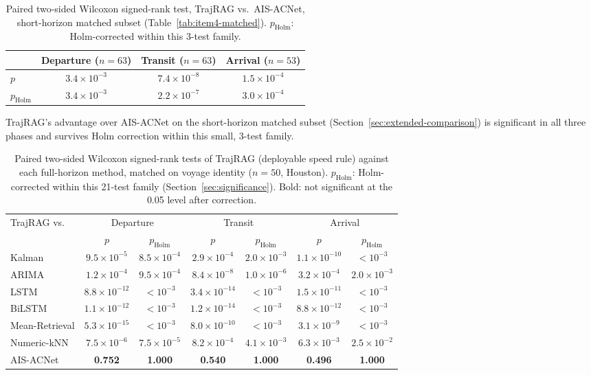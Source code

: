 \begin{table}[t]
\centering
\caption{Paired two-sided Wilcoxon signed-rank test, TrajRAG vs.\
AIS-ACNet, short-horizon matched subset (Table~\ref{tab:item4-matched}).
$p_{\text{Holm}}$: Holm-corrected within this 3-test family.}
\label{tab:item4-wilcoxon}
\footnotesize
\begin{tabular}{lccc}
\toprule
 & Departure ($n=63$) & Transit ($n=63$) & Arrival ($n=53$) \\
\midrule
$p$ & $3.4 \times 10^{-3}$ & $7.4 \times 10^{-8}$ & $1.5 \times 10^{-4}$ \\
$p_{\text{Holm}}$ & $3.4 \times 10^{-3}$ & $2.2 \times 10^{-7}$ & $3.0 \times 10^{-4}$ \\
\bottomrule
\end{tabular}
\end{table}

TrajRAG's advantage over AIS-ACNet on the short-horizon matched subset
(Section~\ref{sec:extended-comparison}) is significant in all three phases
and survives Holm correction within this small, 3-test family.

\begin{table}[t]
\centering
\caption{Paired two-sided Wilcoxon signed-rank tests of TrajRAG (deployable
speed rule) against each full-horizon method, matched on voyage identity
($n=50$, Houston). $p_{\text{Holm}}$: Holm-corrected within this 21-test
family (Section~\ref{sec:significance}). Bold: not significant at the 0.05
level after correction.}
\label{tab:wilcoxon}
\footnotesize
\setlength{\tabcolsep}{3pt}
\begin{tabular}{lcccccc}
\toprule
\multirow{2}{*}{TrajRAG vs.} & \multicolumn{2}{c}{Departure} & \multicolumn{2}{c}{Transit} & \multicolumn{2}{c}{Arrival} \\
\cmidrule(lr){2-3}\cmidrule(lr){4-5}\cmidrule(lr){6-7}
 & $p$ & $p_{\text{Holm}}$ & $p$ & $p_{\text{Holm}}$ & $p$ & $p_{\text{Holm}}$ \\
\midrule
Kalman & $9.5 \times 10^{-5}$ & $8.5\times10^{-4}$ & $2.9 \times 10^{-4}$ & $2.0\times10^{-3}$ & $1.1 \times 10^{-10}$ & $<10^{-3}$ \\
ARIMA & $1.2 \times 10^{-4}$ & $9.5\times10^{-4}$ & $8.4 \times 10^{-8}$ & $1.0\times10^{-6}$ & $3.2 \times 10^{-4}$ & $2.0\times10^{-3}$ \\
LSTM & $8.8 \times 10^{-12}$ & $<10^{-3}$ & $3.4 \times 10^{-14}$ & $<10^{-3}$ & $1.5 \times 10^{-11}$ & $<10^{-3}$ \\
BiLSTM & $1.1 \times 10^{-12}$ & $<10^{-3}$ & $1.2 \times 10^{-14}$ & $<10^{-3}$ & $8.8 \times 10^{-12}$ & $<10^{-3}$ \\
Mean-Retrieval & $5.3 \times 10^{-15}$ & $<10^{-3}$ & $8.0 \times 10^{-10}$ & $<10^{-3}$ & $3.1 \times 10^{-9}$ & $<10^{-3}$ \\
Numeric-kNN & $7.5 \times 10^{-6}$ & $7.5\times10^{-5}$ & $8.2 \times 10^{-4}$ & $4.1\times10^{-3}$ & $6.3 \times 10^{-3}$ & $2.5\times10^{-2}$ \\
AIS-ACNet & \textbf{0.752} & \textbf{1.000} & \textbf{0.540} & \textbf{1.000} & \textbf{0.496} & \textbf{1.000} \\
\bottomrule
\end{tabular}
\end{table}

